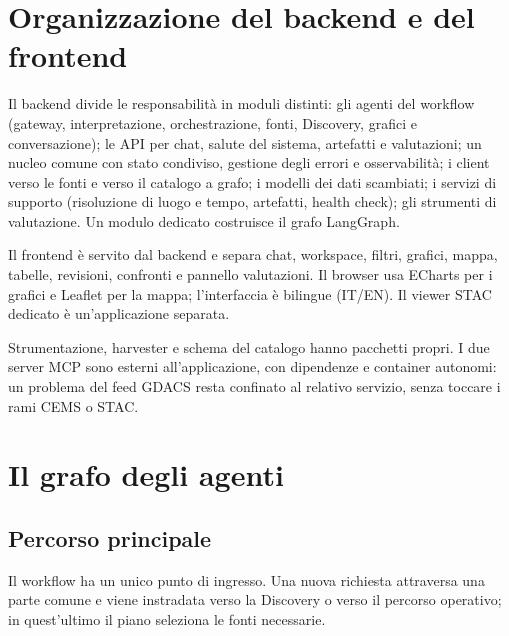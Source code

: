 \section{Organizzazione del backend e del frontend}

Il backend divide le responsabilità in moduli distinti: gli agenti del
workflow (gateway, interpretazione, orchestrazione, fonti, Discovery, grafici e
conversazione); le API per chat, salute del sistema, artefatti e valutazioni; un
nucleo comune con stato condiviso, gestione degli errori e osservabilità; i
client verso le fonti e verso il catalogo a grafo; i modelli dei dati scambiati;
i servizi di supporto (risoluzione di luogo e tempo, artefatti, health check);
gli strumenti di valutazione. Un modulo dedicato costruisce il grafo LangGraph.

Il frontend è servito dal backend e separa chat, workspace, filtri, grafici,
mappa, tabelle, revisioni, confronti e pannello valutazioni. Il browser usa
ECharts per i grafici e Leaflet per la mappa; l'interfaccia è bilingue
(IT/EN). Il viewer STAC dedicato è un'applicazione separata.

Strumentazione, harvester e schema del catalogo hanno pacchetti propri. I due
server MCP sono esterni all'applicazione, con dipendenze e container autonomi:
un problema del feed GDACS resta confinato al relativo servizio, senza toccare
i rami CEMS o STAC.

\section{Il grafo degli agenti}

\subsection{Percorso principale}

Il workflow ha un unico punto di ingresso. Una nuova richiesta attraversa una
parte comune e viene instradata verso la Discovery o verso il percorso
operativo; in quest'ultimo il piano seleziona le fonti necessarie.

